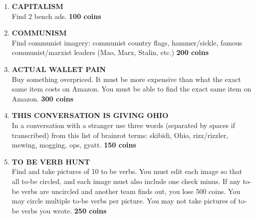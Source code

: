 \documentclass{article}
\begin{document}
\begin{enumerate}
    \item \textbf{CAPITALISM} \\ Find 2 bench ads. \textbf{100 coins}
    \item \textbf{COMMUNISM} \\ Find communist imagery: communist country flags, hammer/sickle, famous communist/marxist leaders (Mao, Marx, Stalin, etc.) \textbf{200 coins}
    \item \textbf{ACTUAL WALLET PAIN} \\ Buy something overpriced. It must be more expensive than what the exact same item costs on Amazon. You must be able to find the exact same item on Amazon. \textbf{300 coins}
    \item \textbf{THIS CONVERSATION IS GIVING OHIO} \\ In a conversation with a stranger use three words (separated by spaces if transcribed) from this list of brainrot terms: skibidi, Ohio, rizz/rizzler, mewing, mogging, ops, gyatt. \textbf{150 coins}
    \item \textbf{TO BE VERB HUNT} \\  Find and take pictures of 10 to be verbs. You must edit each image so that all to-be circled, and each image must also include one check minus. If any to-be verbs are uncircled and another team finds out, you lose 500 coins. You may circle multiple to-be verbs per picture. You may not take pictures of to-be verbs you wrote. \textbf{250 coins}

\end{enumerate}
\end{document}
